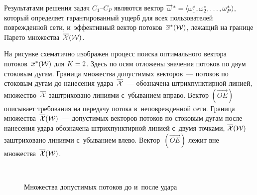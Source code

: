 \begin{multicols}{2}
Результатами решения задач $C_1$--$C_{P}$ являются вектор
$\overrightarrow{\omega}^*\hm = \langle  \omega^*_1,  \omega^*_2, \ldots,  
\omega^*_{P} \rangle, $
который определяет гарантированный ущерб для всех пользователей 
поврежденной сети, 
и~эффективный вектор потоков~$\overline x^*({\cal W})$, лежащий на границе 
Парето мно\-жества~$\overline{{\cal X}}({\cal W})$.

На рисунке схематично изображен процесс поиска оптимального вектора 
потоков~$\overline x^*({\cal W})$ для $K \hm= 2$. Здесь по осям отложены значения 
потоков по двум стоковым дугам. Граница множества до\-пус\-ти\-мых векторов~--- 
потоков по стоковым дугам до нанесения удара~$\overline{{\cal X}}$~--- обозначена 
штрихпунктирной линией, множество~$\overline{{\cal X}}$ заштриховано линиями с~убыванием вправо.
Вектор $(\overrightarrow{OE})$ описывает требования на передачу потока 
в~неповрежденной сети.  
Граница множества~$\overline{{\cal X}}({\cal W})$~--- допустимых 
век\-то\-ров по\-то\-ков по стоковым дугам после нанесения удара обозначена штрихпунктирной 
линией с~двумя точками, $\overline{{\cal X}}({\cal W})$ заштриховано линиями с~убыванием влево. 
Вектор~$(\overrightarrow{OE})$ лежит вне множества~$\overline{{\cal X}}({\cal W})$.

\begin{figure*} %
\vspace*{1pt}
 \begin{center}
 \mbox{%
 \epsfxsize=99.743mm 
 }

\vspace*{6pt}

{\small Множества допустимых потоков до и~после удара}

 \end{center}
\end{figure*}



\end{multicols}
